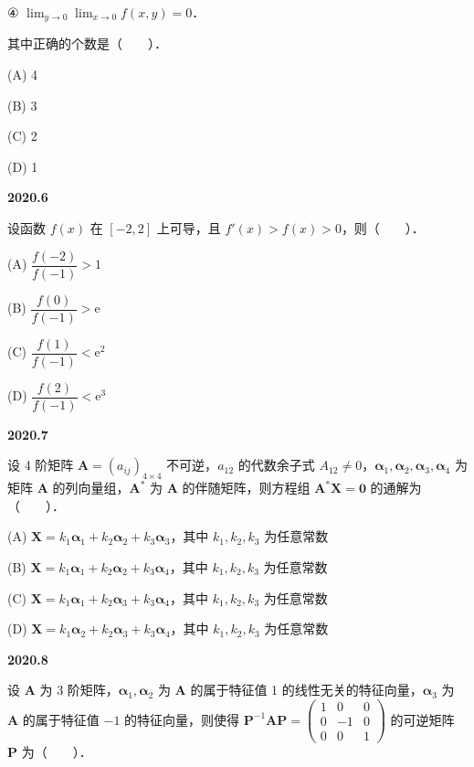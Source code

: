 \documentclass[UTF8,12pt,fontset=windows]{ctexart}
\begin{document}
④ $\lim_{y\to 0}\lim_{x\to 0} f(x,y) = 0$．

其中正确的个数是（　　）．

(A) 4

(B) 3

(C) 2

(D) 1

\vfill
\newpage
{\large\bfseries 2020.6}

设函数 $f(x)$ 在 $[-2,2]$ 上可导，且 $f'(x) > f(x) > 0$，则（　　）．

(A) $\dfrac{f(-2)}{f(-1)} > 1$

(B) $\dfrac{f(0)}{f(-1)} > \mathrm{e}$

(C) $\dfrac{f(1)}{f(-1)} < \mathrm{e}^2$

(D) $\dfrac{f(2)}{f(-1)} < \mathrm{e}^3$

\vfill
\newpage
{\large\bfseries 2020.7}

设 4 阶矩阵 $\boldsymbol{A} = (a_{ij})_{4\times 4}$ 不可逆，$a_{12}$ 的代数余子式 $A_{12} \neq 0$，$\boldsymbol{\alpha}_1, \boldsymbol{\alpha}_2, \boldsymbol{\alpha}_3, \boldsymbol{\alpha}_4$ 为矩阵 $\boldsymbol{A}$ 的列向量组，$\boldsymbol{A}^*$ 为 $\boldsymbol{A}$ 的伴随矩阵，则方程组 $\boldsymbol{A}^*\boldsymbol{X} = \boldsymbol{0}$ 的通解为（　　）．

(A) $\boldsymbol{X} = k_1\boldsymbol{\alpha}_1 + k_2\boldsymbol{\alpha}_2 + k_3\boldsymbol{\alpha}_3$，其中 $k_1, k_2, k_3$ 为任意常数

(B) $\boldsymbol{X} = k_1\boldsymbol{\alpha}_1 + k_2\boldsymbol{\alpha}_2 + k_3\boldsymbol{\alpha}_4$，其中 $k_1, k_2, k_3$ 为任意常数

(C) $\boldsymbol{X} = k_1\boldsymbol{\alpha}_1 + k_2\boldsymbol{\alpha}_3 + k_3\boldsymbol{\alpha}_4$，其中 $k_1, k_2, k_3$ 为任意常数

(D) $\boldsymbol{X} = k_1\boldsymbol{\alpha}_2 + k_2\boldsymbol{\alpha}_3 + k_3\boldsymbol{\alpha}_4$，其中 $k_1, k_2, k_3$ 为任意常数

\vfill
\newpage
{\large\bfseries 2020.8}

设 $\boldsymbol{A}$ 为 3 阶矩阵，$\boldsymbol{\alpha}_1, \boldsymbol{\alpha}_2$ 为 $\boldsymbol{A}$ 的属于特征值 1 的线性无关的特征向量，$\boldsymbol{\alpha}_3$ 为 $\boldsymbol{A}$ 的属于特征值 $-1$ 的特征向量，则使得 $\boldsymbol{P}^{-1}\boldsymbol{A}\boldsymbol{P} = \begin{pmatrix} 1 & 0 & 0 \\ 0 & -1 & 0 \\ 0 & 0 & 1 \end{pmatrix}$ 的可逆矩阵 $\boldsymbol{P}$ 为（　　）．
\end{document}
